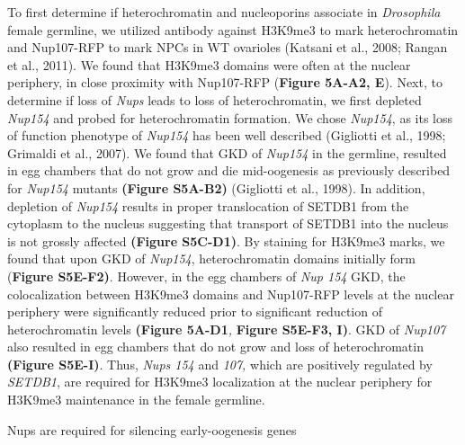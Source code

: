 \documentclass[12pt,oneside]{reedthesis}
\begin{document}
To first determine if heterochromatin and nucleoporins associate in
\emph{Drosophila} female germline, we utilized antibody against H3K9me3 to
mark heterochromatin and Nup107-RFP to mark NPCs in WT ovarioles
(Katsani et al., 2008; Rangan et al., 2011). We found that H3K9me3 domains
were often at the nuclear periphery, in close proximity with Nup107-RFP
(\textbf{Figure 5A-A2, E}). Next, to determine if loss of \emph{Nups} leads to
loss of heterochromatin, we first depleted \emph{Nup154} and probed for
heterochromatin formation. We chose \emph{Nup154}, as its loss of function
phenotype of \emph{Nup154} has been well described
(Gigliotti et al., 1998; Grimaldi et al., 2007). We found that GKD of
\emph{Nup154} in the germline, resulted in egg chambers that do not grow and
die mid-oogenesis as previously described for \emph{Nup154} mutants \textbf{(Figure
S5A-B2)} (Gigliotti et al., 1998). In addition, depletion
of \emph{Nup154} results in proper translocation of SETDB1 from the cytoplasm
to the nucleus suggesting that transport of SETDB1 into the nucleus is
not grossly affected \textbf{(Figure S5C-D1)}. By staining for H3K9me3 marks,
we found that upon GKD of \emph{Nup154}, heterochromatin domains initially
form (\textbf{Figure S5E-F2)}. However, in the egg chambers of \emph{Nup 154} GKD,
the colocalization between H3K9me3 domains and Nup107-RFP levels at the
nuclear periphery were significantly reduced prior to significant
reduction of heterochromatin levels \textbf{(Figure 5A-D1}\emph{,} \textbf{Figure
S5E-F3, I)}. GKD of \emph{Nup107} also resulted in egg chambers that do not
grow and loss of heterochromatin \textbf{(Figure S5E-I)}. Thus, \emph{Nups 154}
and \emph{107,} which are positively regulated by \emph{SETDB1}, are required for
H3K9me3 localization at the nuclear periphery for H3K9me3 maintenance in
the female germline.

Nups are required for silencing early-oogenesis genes
\end{document}
